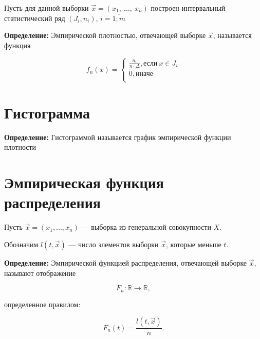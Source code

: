 Пусть для данной выборки $\vec x = (x_1,\ \ldots,\ x_n)$ построен интервальный статистический ряд $(J_i, n_i)$, $i = \overline{1; m}$

\textbf{Определение:} Эмпирической плотностью, отвечающей выборке $\vec x$, называется функция

$$ 
f_n(x) = 
\begin{cases}
    \frac{n_i}{n \cdot \Delta}, \text{если}\  x \in J_i \\
    0, \text{иначе} \\
\end{cases}
$$

\section{Гистограмма}

\textbf{Определение:} Гистограммой называется график эмпирической функции плотности

\section{Эмпирическая функция распределения}

Пусть $\vec x = (x_1, ..., x_n)$ --- выборка из генеральной совокупности $X$.

Обозначим $l(t, \vec x)$ --- число элементов выборки $\vec x$, которые меньше $t$.

\textbf{Определение:} Эмпирической функцией распределения, отвечающей выборке $\vec x$, называют отображение

$$ F_n: {\mathbb{R}} \to {\mathbb{R}}, $$

определенное правилом:

$$ F_n(t) = \frac{l(t, \vec x)}{n}. $$
